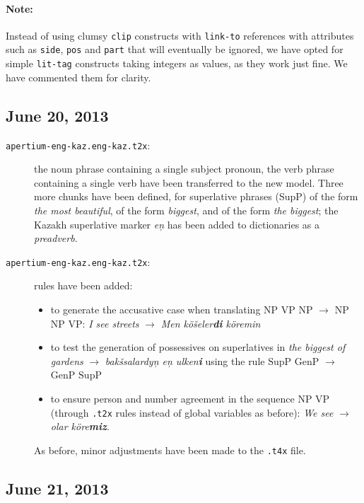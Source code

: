 \documentclass{article}
\begin{document}
\paragraph{Note:} Instead of using clumsy \texttt{clip} constructs with \texttt{link-to} references with attributes such as \texttt{side}, \texttt{pos} and \texttt{part} that will eventually be ignored, we have opted for simple \texttt{lit-tag} constructs taking integers as values, as they work just fine. We have commented them for clarity. 

\subsection{June 20, 2013}
\begin{description}
\item[\texttt{apertium-eng-kaz.eng-kaz.t2x}:] the noun phrase containing a single subject pronoun, the verb phrase containing a single verb have been transferred to the new model. Three more chunks have been defined, for superlative phrases (SupP) of the form \emph{the most beautiful}, of the form \emph{biggest}, and of the form \emph{the biggest}; the Kazakh superlative marker \emph{e\c{n}} has been added to dictionaries as a \emph{preadverb}.
\item[\texttt{apertium-eng-kaz.eng-kaz.t2x}:] rules have been added: 
  \begin{itemize}
  \item to generate the accusative case when translating \(\mathrm{NP}\) \(\mathrm{VP}\) \(\mathrm{NP}\) \(\to\) \(\mathrm{NP}\) \(\mathrm{NP}\) \(\mathrm{VP}\): \emph{I see streets} \(\to\) \emph{Men kö\v{s}eler\textbf{di} köremin}
  \item to test the generation of possessives on superlatives in \emph{the biggest of gardens} \(\to\) \emph{bak\v{s}salardy\c{n} e\c{n} ulken\textbf{i}} using the rule \(\mathrm{SupP}\) \(\mathrm{GenP}\) \(\to\) \(\mathrm{GenP}\)  \(\mathrm{SupP}\)
  \item to ensure person and number agreement in the sequence  \(\mathrm{NP}\)  \(\mathrm{VP}\) (through \texttt{.t2x} rules instead of global variables as before): \emph{We see} \(\to\) \emph{olar köre\textbf{miz}}.
  \end{itemize}
As before, minor adjustments have been made to the \texttt{.t4x} file. 



\end{description}
\subsection{June 21, 2013}
\end{document}
